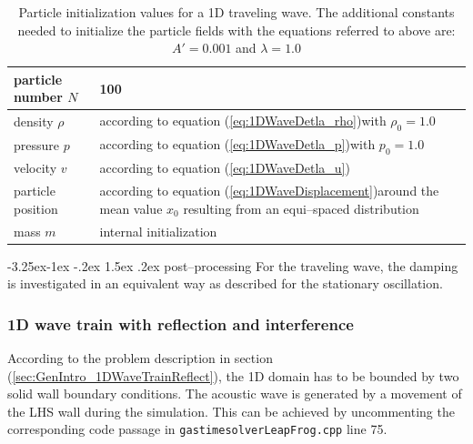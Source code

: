 \documentclass[11pt,a4paper,twoside]{report}
\makeatletter
\renewcommand\paragraph{\@startsection{paragraph}{4}{\z@}%
  {-3.25ex\@plus -1ex \@minus -.2ex}%
  {1.5ex \@plus .2ex}%
  {\normalfont\normalsize\bfseries}}
\makeatother
\begin{document}
\begin{table}[h] %
\label{tab:InitPartValues_1DTravelingWave}
\centering

\begin{tabular}[c]{|l|p{5cm}|} %
\hline
\hline
particle number $N$ &  100\\
\hline
density $\rho$ &  according to equation (\ref{eq:1DWaveDetla_rho})\newline with $\rho_0=1.0$\\
\hline
pressure $p$ &  according to equation (\ref{eq:1DWaveDetla_p})\newline with $p_0=1.0$\\
\hline
velocity $v$ & according to equation (\ref{eq:1DWaveDetla_u})\\
\hline
particle position & according to equation (\ref{eq:1DWaveDisplacement})\newline around the mean value $x_0$\newline
resulting from an equi--spaced distribution \\
\hline
mass $m$ & internal initialization\\
\hline
\hline
\end{tabular}
\caption[]{Particle initialization values for a 1D traveling wave. The additional constants needed to initialize the particle fields with the equations referred to above are: $A'=0.001$ and $\lambda=1.0$}

\end{table}

\paragraph{post--processing}
For the traveling wave, the damping is investigated in an equivalent way as described for the stationary oscillation.

\subsubsection{1D wave train with reflection and interference}
According to the problem description in section (\ref{sec:GenIntro_1DWaveTrainReflect}), the 1D domain has to be bounded by two solid wall boundary conditions. The acoustic wave is generated by a movement of the LHS wall during the simulation. This can be achieved by uncommenting the corresponding code passage in {\tt gastimesolverLeapFrog.cpp} line 75. 
\end{document}
